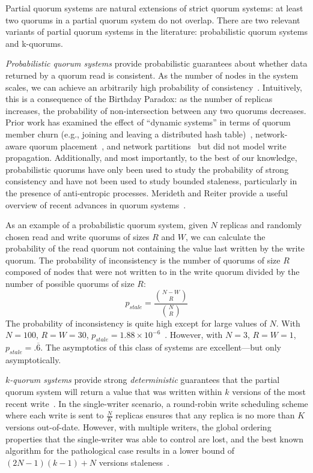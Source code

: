 \documentclass{vldb}
\begin{document}
Partial quorum systems are natural extensions of strict quorum
systems: at least two quorums in a partial quorum system do not
overlap.  There are two relevant variants of partial quorum systems in
the literature: probabilistic quorum systems and k-quorums.

\textit{Probabilistic quorum systems} provide probabilistic guarantees
about whether data returned by a quorum read is consistent.  As the
number of nodes in the system scales, we can achieve an arbitrarily
high probability of consistency~\cite{prob-quorum}.  Intuitively, this
is a consequence of the Birthday Paradox: as the number of replicas
increases, the probability of non-intersection between any two quorums
decreases.  Prior work has examined the effect of ``dynamic systems''
in terms of quorum member churn (e.g., joining and leaving a
distributed hash table)~\cite{prob-quorum-dynamic}, network-aware
quorum placement~\cite{delay-quorum, quorum-placement}, and network
partitions~\cite{partitionedquorum} but did not model write
propagation. Additionally, and most importantly, to the best of our
knowledge, probabilistic quorums have only been used to study the
probability of strong consistency and have not been used to study
bounded staleness, particularly in the presence of anti-entropic
processes.  Merideth and Reiter provide a useful overview of recent
advances in quorum systems~\cite{quorum-overview}.

As an example of a probabilistic quorum system, given $N$ replicas and
randomly chosen read and write quorums of sizes $R$ and $W$, we can
calculate the probability of the read quorum not containing the value
last written by the write quorum.  The probability of inconsistency is
the number of quorums of size $R$ composed of nodes that were not
written to in the write quorum divided by the number of possible
quorums of size $R$:
\begin{equation}
\label{eq:prob-strict}
p_{stale}=\frac{{N-W \choose R}}{{N \choose R}}
\end{equation}
The probability of inconsistency is quite high except for large values
of $N$.  With $N=100$, $R=W=30$, $p_{stale} = 1.88 \times
10^{-6}$~\cite{non-strict}.  However, with $N=3$, $R=W=1$, $p_{stale}
= .\overline{6}$.  The asymptotics of this class of systems are
excellent---but only asymptotically.

\textit{$k$-quorum systems} provide strong \textit{deterministic}
guarantees that the partial quorum system will return a value that was
written within $k$ versions of the most recent
write~\cite{non-strict}.  In the single-writer scenario, a round-robin
write scheduling scheme where each write is sent to $\frac{N}{K}$
replicas ensures that any replica is no more than $K$ versions
out-of-date.  However, with multiple writers, the global ordering
properties that the single-writer was able to control are lost, and
the best known algorithm for the pathological case results in a lower
bound of $(2N-1)(k-1)+N$ versions staleness~\cite{multi-k-quorum}.
\end{document}
